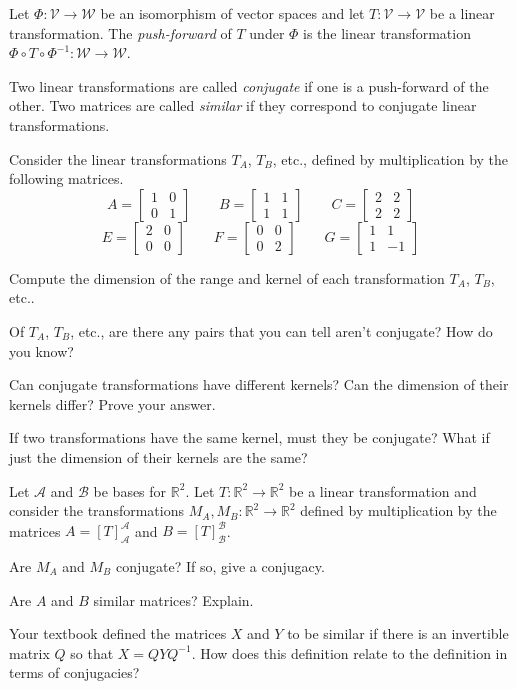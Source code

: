 \documentclass[14pt]{problemset}
\newcommand{\R}{\mathbb{R}}
\newcommand{\mat}[1]{\begin{bmatrix}#1\end{bmatrix}}
\begin{document}
	\begin{definition}
		Let $\Phi:\mathcal V\to\mathcal W$ be an isomorphism of vector spaces
		and let $T:\mathcal V\to\mathcal V$ be a linear transformation. The 
		\emph{push-forward} of $T$ under $\Phi$ is the linear transformation
		$\Phi\circ T\circ \Phi^{-1}:\mathcal W\to\mathcal W$.

		Two linear transformations are called \emph{conjugate} if one is a push-forward
		of the other. Two matrices are called \emph{similar} if they correspond to
		conjugate linear transformations.
	\end{definition}

	\question
	Consider the linear transformations $T_A$, $T_B$, etc., defined by multiplication
	by the following matrices.
	\[
		A=\mat{1&0\\0&1}\qquad B=\mat{1&1\\1&1}\qquad C=\mat{2&2\\2&2}
	\]
	\[
		E=\mat{2&0\\0&0}\qquad F=\mat{0&0\\0&2}\qquad G=\mat{1&1\\1&-1}
	\]
	\begin{parts}
		\item Compute the dimension of the range and kernel of each transformation $T_A$, $T_B$, etc..
		\item Of $T_A$, $T_B$, etc., are there any pairs that you can
			tell aren't conjugate? How do you know?
		\item Can conjugate transformations have different kernels? Can the dimension of their
			kernels differ? Prove your answer.
		\item If two transformations have the same kernel, must they be conjugate? What if just the dimension
			of their kernels are the same?
	\end{parts}
	
	\question
		Let $\mathscr A$ and $\mathscr B$ be bases for $\R^2$.
			Let $T:\R^2\to\R^2$ be a linear transformation
			and consider the transformations
			$M_A,M_B:\R^2\to\R^2$ defined by multiplication by the matrices $A=[T]_{\mathscr A}^{\mathscr A}$
			and $B=[T]_{\mathscr B}^{\mathscr B}$.
	\begin{parts}
		\item Are $M_A$ and $M_B$ conjugate? If so, give a conjugacy.
		\item Are $A$ and $B$ similar matrices? Explain.
		\item Your textbook defined the matrices $X$ and $Y$ to be similar if there is an invertible
			matrix $Q$ so that $X=QYQ^{-1}$. How does this definition relate
			to the definition in terms of conjugacies?
	\end{parts}
\end{document}
